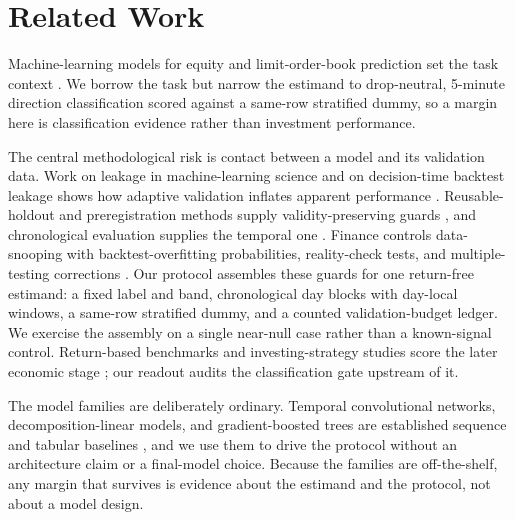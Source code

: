 \section{Related Work}

Machine-learning models for equity and limit-order-book prediction set the task
context \cite{gu2020empirical,fischer2018deep,zhang2019deeplob}. We borrow the
task but narrow the estimand to drop-neutral, 5-minute direction classification
scored against a same-row stratified dummy, so a \macrofone{} margin here is
classification evidence rather than investment performance.

The central methodological risk is contact between a model and its validation
data. Work on leakage in machine-learning science and on decision-time backtest
leakage shows how adaptive validation inflates apparent performance
\cite{kapoor2023leakage,zhang2026whenalpha}. Reusable-holdout and
preregistration methods supply validity-preserving guards
\cite{dwork2015reusable,hofman2023preregistration}, and chronological
evaluation supplies the temporal one \cite{hyndman2021forecasting}. Finance
controls data-snooping with backtest-overfitting probabilities, reality-check
tests, and multiple-testing corrections
\cite{lopezdeprado2018advances,bailey2014pseudo,bailey2016probability,harvey2016cross,white2000reality,sullivan1999datasnooping}.
Our protocol assembles these guards for one return-free \macrofone{} estimand:
a fixed label and band, chronological day blocks with day-local windows, a
same-row stratified dummy, and a counted validation-budget ledger. We exercise
the assembly on a single near-null case rather than a known-signal control.
Return-based benchmarks and investing-strategy studies score the later economic
stage \cite{zhang2026whenalpha,li2026finsaber}; our readout audits the
classification gate upstream of it.

The model families are deliberately ordinary. Temporal convolutional networks,
decomposition-linear models, and gradient-boosted trees are established sequence
and tabular baselines
\cite{bai2018empirical,zeng2023dlinear,ke2017lightgbm,grinsztajn2022tree}, and
we use them to drive the protocol without an architecture claim or a final-model
choice. Because the families are off-the-shelf, any margin that survives is
evidence about the estimand and the protocol, not about a model design.

